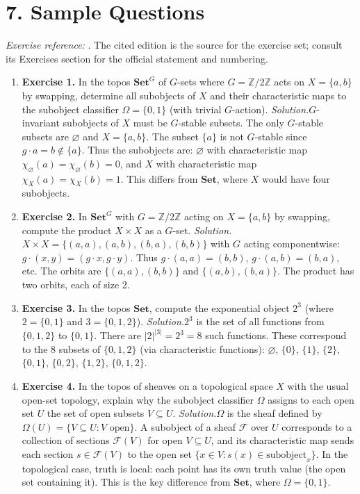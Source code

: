 \section*{7. Sample Questions}
\emph{Exercise reference:} \cite{topos_ref1}. The cited edition is the source for the exercise set; consult its Exercises section for the official statement and numbering.
\begin{enumerate}[leftmargin=*,itemsep=0.9em]
\item \textbf{Exercise 1.} In the topos $\mathbf{Set}^G$ of $G$-sets where $G = \mathbb{Z}/2\mathbb{Z}$ acts on $X = \{a, b\}$ by swapping, determine all subobjects of $X$ and their characteristic maps to the subobject classifier $\Omega = \{0, 1\}$ (with trivial $G$-action). \emph{Solution.}$G$-invariant subobjects of $X$ must be $G$-stable subsets. The only $G$-stable subsets are $\varnothing$ and $X = \{a, b\}$. The subset $\{a\}$ is not $G$-stable since $g \cdot a = b \notin \{a\}$. Thus the subobjects are: $\varnothing$ with characteristic map $\chi_\varnothing(a) = \chi_\varnothing(b) = 0$, and $X$ with characteristic map $\chi_X(a) = \chi_X(b) = 1$. This differs from $\mathbf{Set}$, where $X$ would have four subobjects.

\item \textbf{Exercise 2.} In $\mathbf{Set}^G$ with $G = \mathbb{Z}/2\mathbb{Z}$ acting on $X = \{a,b\}$ by swapping, compute the product $X \times X$ as a $G$-set. \emph{Solution.}$X \times X = \{(a,a), (a,b), (b,a), (b,b)\}$ with $G$ acting componentwise: $g \cdot (x,y) = (g \cdot x, g \cdot y)$. Thus $g \cdot (a,a) = (b,b)$, $g \cdot (a,b) = (b,a)$, etc. The orbits are $\{(a,a), (b,b)\}$ and $\{(a,b), (b,a)\}$. The product has two orbits, each of size 2.

\item \textbf{Exercise 3.} In the topos $\mathbf{Set}$, compute the exponential object $2^3$ (where $2 = \{0,1\}$ and $3 = \{0,1,2\}$). \emph{Solution.}$2^3$ is the set of all functions from $\{0,1,2\}$ to $\{0,1\}$. There are $|2|^{|3|} = 2^3 = 8$ such functions. These correspond to the 8 subsets of $\{0,1,2\}$ (via characteristic functions): $\varnothing$, $\{0\}$, $\{1\}$, $\{2\}$, $\{0,1\}$, $\{0,2\}$, $\{1,2\}$, $\{0,1,2\}$.

\item \textbf{Exercise 4.} In the topos of sheaves on a topological space $X$ with the usual open-set topology, explain why the subobject classifier $\Omega$ assigns to each open set $U$ the set of open subsets $V \subseteq U$. \emph{Solution.}$\Omega$ is the sheaf defined by $\Omega(U) = \{V \subseteq U : V \text{ open}\}$. A subobject of a sheaf $\mathcal{F}$ over $U$ corresponds to a collection of sections $\mathcal{F}(V)$ for open $V \subseteq U$, and its characteristic map sends each section $s \in \mathcal{F}(V)$ to the open set $\{x \in V : s(x) \in \text{subobject}_x\}$. In the topological case, truth is local: each point has its own truth value (the open set containing it). This is the key difference from $\mathbf{Set}$, where $\Omega = \{0,1\}$.


\end{enumerate}
